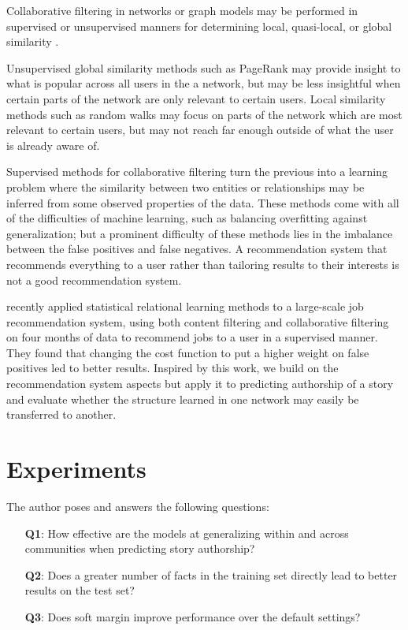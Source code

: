 \documentclass[letterpaper]{article}
\begin{document}
Collaborative filtering in networks or graph models may be performed in supervised or unsupervised manners for determining local, quasi-local, or global similarity \cite{nickel2016review,breese1998empirical}.

Unsupervised global similarity methods such as PageRank may provide insight to what is popular across all users in the a network, but may be less insightful when certain parts of the network are only relevant to certain users. Local similarity methods such as random walks may focus on parts of the network which are most relevant to certain users, but may not reach far enough outside of what the user is already aware of.

Supervised methods for collaborative filtering turn the previous into a learning problem where the similarity between two entities or relationships may be inferred from some observed properties of the data. These methods come with all of the difficulties of machine learning, such as balancing overfitting against generalization; but a prominent difficulty of these methods lies in the imbalance between the false positives and false negatives. A recommendation system that recommends everything to a user rather than tailoring results to their interests is not a good recommendation system.

\cite{yang2017combining} recently applied statistical relational learning methods to a large-scale job recommendation system, using both content filtering and collaborative filtering on four months of data to recommend jobs to a user in a supervised manner.  They found that changing the cost function to put a higher weight on false positives led to better results. Inspired by this work, we build on the recommendation system aspects but apply it to predicting authorship of a story and evaluate whether the structure learned in one network may easily be transferred to another.

\section{Experiments}

The author poses and answers the following questions:

\begin{enumerate}
    \item[\textbf{Q1}:] How effective are the models at generalizing within and across communities when predicting story authorship?
    \item[\textbf{Q2}:] Does a greater number of facts in the training set directly lead to better results on the test set?
    \item[\textbf{Q3}:] Does soft margin improve performance over the default settings?
\end{enumerate}
\end{document}
